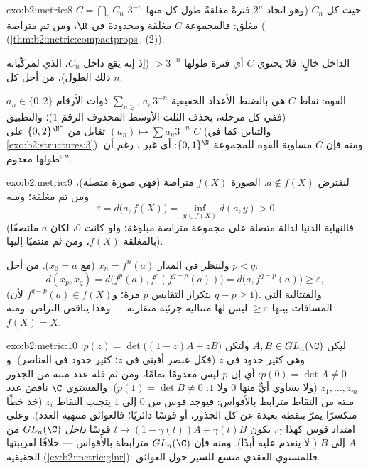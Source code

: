 \begin{solution}{exo:b2:metric:8}
$C = \bigcap_n C_n$ حيث كل $C_n$ (وهو اتحاد $2^n$ فترةً مغلقةً
طول كل منها $3^{-n}$) مغلق: فالمجموعة $C$ مغلقة ومحدودة
في $\R$، ومن ثم متراصة (\cref{thm:b2:metric:compactprops}~(2)).

الداخل خالٍ: فلا يحتوي $C$ أي فترة طولها $> 3^{-n}$ (إذ إنه
يقع داخل $C_n$، الذي لمركّباته ذلك الطول)، من أجل كل
$n$.

القوة: نقاط $C$ هي بالضبط الأعداد الحقيقية $\sum_{n\geq1}
a_n 3^{-n}$ ذوات الأرقام $a_n \in \{0, 2\}$ (ففي كل مرحلة،
يحذف الثلث الأوسط المحذوف الرقمَ $1$)؛ والتطبيق $(a_n) \mapsto
\sum a_n 3^{-n}$ تقابل من $\{0,2\}^{\N^*}$ على $C$
(والتباين كما في \cref{exo:b2:structures:3}). ومنه فإن $C$ مساوية القوة
للمجموعة $\{0,1\}^{\N}$: أي غير ، رغم أن ``طولها معدوم''.
\end{solution}

\begin{solution}{exo:b2:metric:9}
لنفترض $a \notin f(X)$. الصورة $f(X)$ متراصة (فهي صورة
متصلة)، ومن ثم مغلقة؛ ومنه
\[
\varepsilon = d\bigl(a, f(X)\bigr)
= \inf_{y \in f(X)} d(a, y) > 0
\]
(فالنهاية الدنيا لدالة متصلة على مجموعة متراصة مبلوغة؛
ولو كانت $0$، لكان $a$ ملتصقًا بالمغلقة $f(X)$، ومن ثم منتميًا
إليها).

ولننظر في المدار $x_n = f^n(a)$ (مع $x_0 = a$). من أجل $p < q$:
\[
d(x_p, x_q) = d\bigl(f^p(a), f^p(f^{q-p}(a))\bigr)
= d\bigl(a, f^{q-p}(a)\bigr) \geq \varepsilon,
\]
(بتكرار التقايس $p$ مرة؛ و$f^{q-p}(a) \in f(X)$ لأن $q - p
\geq 1$). والمتتالية التي المسافات بينها $\geq \varepsilon$ ليس لها
متتالية جزئية متقاربة --- وهذا يناقض التراص. ومنه $f(X) =
X$.
\end{solution}

\begin{solution}{exo:b2:metric:10}
ليكن $A, B \in GL_n(\C)$ ولتكن $p(z) = \det\bigl((1-z)A + zB\bigr)$: وهي
كثير حدود في $z$ (فكل عنصر أفيني في $z$؛ 
كثير حدود في العناصر). و$p(0) = \det A \neq 0$: أي إن $p$ ليس
معدومًا تمامًا، ومن ثم فله عدد منته من الجذور $z_1, \dots, z_m$
(ولا يساوي أيٌّ منها $0$ ولا $1$: $p(1) = \det B \neq 0$). والمستوي $\C$
ناقصَ عدد منته من النقاط مترابط بالأقواس: فيوجد قوس من $0$ إلى $1$
يتجنب النقاط $z_i$ (خذ خطًا منكسرًا يمرّ بنقطة بعيدة
عن كل الجذور، أو قوسًا دائريًا؛ فالعوائق منتهية العدد).
وعلى امتداد قوس كهذا $\gamma$، يكون $t \mapsto (1 - \gamma(t))A +
\gamma(t)B$ قوسًا  \emph{داخل} $GL_n(\C)$ من $A$
إلى $B$ ( لا ينعدم عليه أبدًا). ومنه فإن $GL_n(\C)$
مترابطة بالأقواس --- خلافًا لقريبتها الحقيقية
(\cref{ex:b2:metric:glnr}): فللمستوي العقدي متسع للسير
حول العوائق.
\end{solution}

